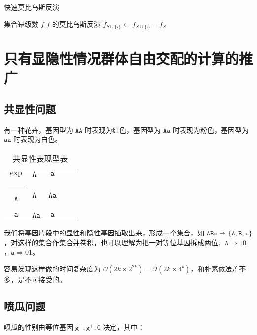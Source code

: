 \documentclass{article}
\makeatletter
\def\hlinewd#1{%
\noalign{\ifnum0=`}\fi\hrule \@height #1 %
\futurelet\reserved@a\@xhline}
\makeatother
\begin{document}
\begin{algorithm}
	\caption{快速莫比乌斯反演}
	\begin{algorithmic}[1]
		\Require 集合幂级数 $f$
		\Ensure $f$ 的莫比乌斯反演
					\State $f_{S \cup \{i\}} \gets f_{S \cup \{i\}} - f_{S}$
				\EndFor
			\EndFor
			\State {}
		\EndFunction
	\end{algorithmic}
\end{algorithm}

\newpage

\section{只有显隐性情况群体自由交配的计算的推广}

\subsection{共显性问题}

有一种花卉，基因型为 $\texttt{AA}$ 时表现为红色，基因型为 $\texttt{Aa}$ 时表现为粉色，基因型为 $\texttt{aa}$ 时表现为白色。

\begin{table}[htbp]
	\centering
	\caption{共显性表现型表}
	\begin{tabular}{cV{3}c|c|c}
		$\operatorname{exp}$ & $\texttt{A}$ & $\texttt{a}$ \\ \hlinewd{1pt}
		$\texttt{A}$ & $\texttt{A}$ & $$\texttt{Aa}$$ \\ \hline
		$\texttt{a}$ & $\texttt{Aa}$ & $$\texttt{a}$$
	\end{tabular}
\end{table}

我们将基因片段中的显性和隐性基因抽取出来，形成一个集合，如 $\texttt{ABc} \Rightarrow \{\texttt{A},\texttt{B},\texttt{c}\}$，对这样的集合作集合并卷积，也可以理解为把一对等位基因拆成两位，$\texttt{A} \Rightarrow 10$，$\texttt{a} \Rightarrow 01$。

容易发现这样做的时间复杂度为 $\mathcal O(2k \times 2^{2k})=\mathcal O(2k \times 4^k)$，和朴素做法差不多，是不可接受的。

\subsection{喷瓜问题}

喷瓜的性别由等位基因 $\texttt{g}^{-},\texttt{g}^{+},\texttt{G}$ 决定，其中：
\end{document}
